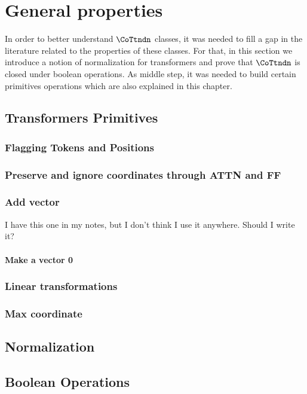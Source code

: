 \chapter{General properties}

In order to better understand $\CoTtndn$ classes, it was needed to fill a gap in the literature related to the properties of these classes.
For that, in this section we introduce a notion of normalization for transformers and prove that $\CoTtndn$ is closed under boolean operations.
As middle step, it was needed to build certain primitives operations which are also explained in this chapter.

\section{Transformers Primitives}

\subsection*{Flagging Tokens and Positions}



\subsection*{Preserve and ignore coordinates through ATTN and FF}



\subsection*{Add vector}

{\color{orange} I have this one in my notes, but I don't think I use it anywhere. Should I write it?}

\subsubsection*{Make a vector 0}

\subsection*{Linear transformations}



\subsection*{Max coordinate}



\section{Normalization}







\section{Boolean Operations}



